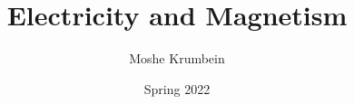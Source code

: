 
\usepackage{subfiles}

\title{Electricity and Magnetism}
\def \thecoursenum {83313}
\def \theinstructor {Yedidya Lior}
\author{Moshe Krumbein}
\date{Spring 2022}





\setcounter{tocdepth}{2}
\tableofcontents
\cleardoublepage




